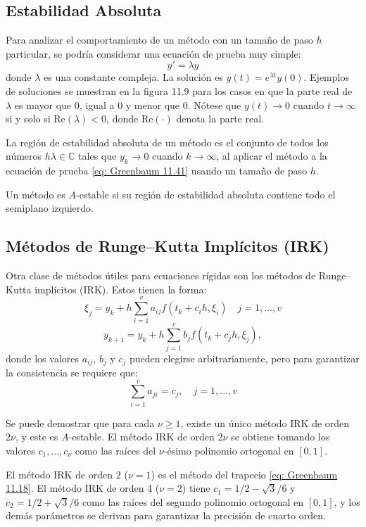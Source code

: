 \subsection{Estabilidad Absoluta}
Para analizar el comportamiento de un método con un tamaño de paso \( h \) particular, se podría considerar una ecuación de prueba muy simple:
\begin{equation}
    \label{eq: Greenbaum 11.41}
    y' = \lambda y
\end{equation}
donde \( \lambda \) es una constante compleja. La solución es \( y(t) = e^{\lambda t} y(0) \). Ejemplos de soluciones se muestran en la figura 11.9 para los casos en que la parte real de \( \lambda \) es mayor que 0, igual a 0 y menor que 0. Nótese que \( y(t) \to 0 \) cuando \( t \to \infty \) si y solo si \( \text{Re}(\lambda) < 0 \), donde \( \text{Re}(\cdot) \) denota la parte real.

\begin{definition}
    La región de estabilidad absoluta de un método es el conjunto de todos los números \( h\lambda \in \mathbb{C} \) tales que \( y_k \to 0 \) cuando \( k \to \infty \), al aplicar el método a la ecuación de prueba \ref{eq: Greenbaum 11.41} usando un tamaño de paso \( h \).
\end{definition}

\begin{definition}
    Un método es \( A \)-estable si su región de estabilidad absoluta contiene todo el semiplano izquierdo.
\end{definition}

\subsection{Métodos de Runge–Kutta Implícitos (IRK)}

Otra clase de métodos útiles para ecuaciones rígidas son los métodos de Runge–Kutta implícitos (IRK). Estos tienen la forma:
\begin{equation}
    \xi_j = y_k + h \sum_{i=1}^{v} a_{ij} f(t_k + c_i h, \xi_i) \quad j = 1, \dots, v
\end{equation}
\begin{equation}
    y_{k + 1} = y_k + h \sum_{j=1}^{v} b_j f(t_k + c_j h, \xi_j), 
\end{equation}
donde los valores \( a_{ij} \), \( b_j \) y \( c_j \) pueden elegirse arbitrariamente, pero para garantizar la consistencia se requiere que:
\[\sum_{i = 1}^{v} a_{ji} = c_j, \quad j = 1,..., v\]

Se puede demostrar que para cada \( \nu \geq 1 \), existe un único método IRK de orden \( 2\nu \), y este es \( A \)-estable. El método IRK de orden \( 2\nu \) se obtiene tomando los valores \( c_1, \dots, c_\nu \) como las raíces del \( \nu \)-ésimo polinomio ortogonal en \([0, 1]\). 

El método IRK de orden 2 (\( \nu = 1 \)) es el método del trapecio \ref{eq: Greenbaum 11.18}. El método IRK de orden 4 (\( \nu = 2 \)) tiene \( c_1 = 1/2 - \sqrt{3} / 6\) y \( c_2 = 1/2 + \sqrt{3} / 6\) como las raíces del segundo polinomio ortogonal en \([0, 1]\), y los demás parámetros se derivan para garantizar la precisión de cuarto orden.
